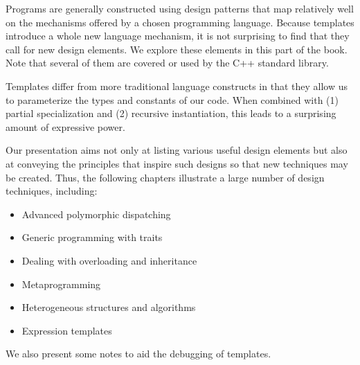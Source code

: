 Programs are generally constructed using design patterns that map relatively well on the mechanisms offered by a chosen programming language. Because templates introduce a whole new language mechanism, it is not surprising to find that they call for new design elements. We explore these elements in this part of the book. Note that several of them are covered or used by the C++ standard library.

Templates differ from more traditional language constructs in that they allow us to parameterize the types and constants of our code. When combined with (1) partial specialization and (2) recursive instantiation, this leads to a surprising amount of expressive power.

Our presentation aims not only at listing various useful design elements but also at conveying the principles that inspire such designs so that new techniques may be created. Thus, the following chapters illustrate a large number of design techniques, including:

\begin{itemize}
\item 
Advanced polymorphic dispatching

\item 
Generic programming with traits

\item 
Dealing with overloading and inheritance

\item 
Metaprogramming

\item 
 Heterogeneous structures and algorithms

\item 
Expression templates
\end{itemize}

We also present some notes to aid the debugging of templates.